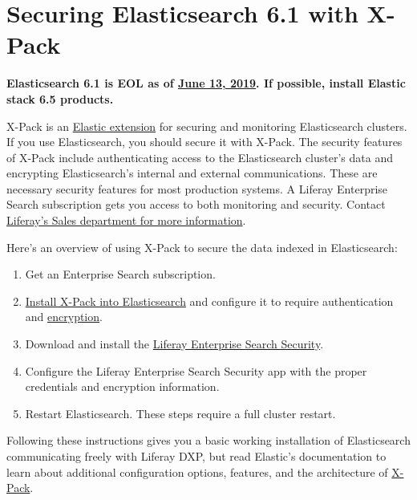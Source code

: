 \chapter{Securing Elasticsearch 6.1 with
X-Pack}\label{securing-elasticsearch-6.1-with-x-pack}

\textbf{Elasticsearch 6.1 is EOL as of
\href{https://www.elastic.co/support/eol}{June 13, 2019}. If possible,
install Elastic stack 6.5 products.}

X-Pack is an
\href{https://www.elastic.co/guide/en/elasticsearch/reference/6.1/setup-xpack.html}{Elastic
extension} for securing and monitoring Elasticsearch clusters. If you
use Elasticsearch, you should secure it with X-Pack. The security
features of X-Pack include authenticating access to the Elasticsearch
cluster's data and encrypting Elasticsearch's internal and external
communications. These are necessary security features for most
production systems. A Liferay Enterprise Search subscription gets you
access to both monitoring and security. Contact
\href{https://www.liferay.com/contact-us\#contact-sales}{Liferay's Sales
department for more information}.

Here's an overview of using X-Pack to secure the data indexed in
Elasticsearch:

\begin{enumerate}
\def\labelenumi{\arabic{enumi}.}
\item
  Get an Enterprise Search subscription.
\item
  \href{https://www.elastic.co/guide/en/x-pack/6.1/installing-xpack.html}{Install
  X-Pack into Elasticsearch} and configure it to require authentication
  and
  \href{https://www.elastic.co/guide/en/elasticsearch/reference/6.1/configuring-tls.html\#configuring-tls}{encryption}.
\item
  Download and install the
  \href{https://web.liferay.com/group/customer/dxp/downloads/enterprise-search}{Liferay
  Enterprise Search Security}.
\item
  Configure the Liferay Enterprise Search Security app with the proper
  credentials and encryption information.
\item
  Restart Elasticsearch. These steps require a full cluster restart.
\end{enumerate}

Following these instructions gives you a basic working installation of
Elasticsearch communicating freely with Liferay DXP, but read Elastic's
documentation to learn about additional configuration options, features,
and the architecture of
\href{https://www.elastic.co/guide/en/elasticsearch/reference/6.1/configuring-security.html}{X-Pack}.


